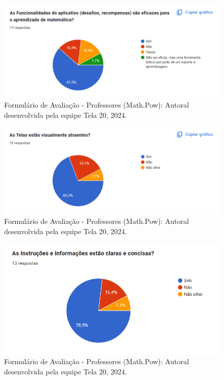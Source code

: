 \documentclass[12pt, openany, oneside, a4paper, english, brazil]{abntex2}   %
\begin{document}
\begin{figure}
    \centering
    \includegraphics[width=0.9\linewidth]{figuras/Formulário Gráficos/Professores/2 As funcinalidades do aplicativo.png}
    \caption{Formulário de Avaliação - Professores (Math.Pow):  Autoral desenvolvida pela equipe Tela 20, 2024.}
    \label{gráfico gerado pelo formulário}
\end{figure}

\begin{figure}
    \centering
    \includegraphics{figuras/Formulário Gráficos/Professores/3 As telas estao visualmente atraeentes.png}
    \caption{Formulário de Avaliação - Professores (Math.Pow):  Autoral desenvolvida pela equipe Tela 20, 2024.}
    \label{gráfico gerado pelo formulário}
\end{figure}

\begin{figure}
    \centering
    \includegraphics{figuras/Formulário Gráficos/Professores/4 Captura de tela 2024-12-10 103647.png}
    \caption{Formulário de Avaliação - Professores (Math.Pow):  Autoral desenvolvida pela equipe Tela 20, 2024.}
    \label{gráfico gerado pelo formulário}
\end{figure}
\end{document}
